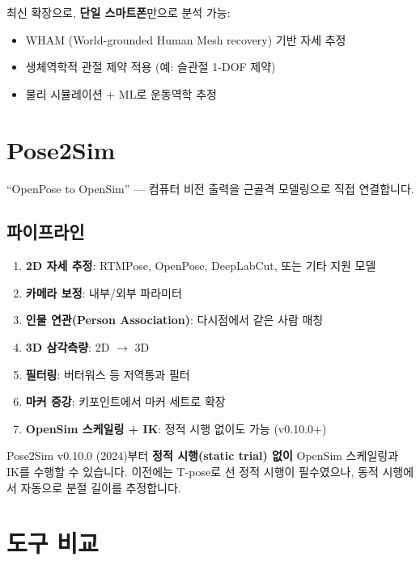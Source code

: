 \documentclass[11pt, a4paper]{report}
\begin{document}
최신 확장으로, \textbf{단일 스마트폰}만으로 분석 가능:
\begin{itemize}[leftmargin=*]
  \item WHAM (World-grounded Human Mesh recovery) 기반 자세 추정
  \item 생체역학적 관절 제약 적용 (예: 슬관절 1-DOF 제약)
  \item 물리 시뮬레이션 + ML로 운동역학 추정
\end{itemize}


\section{Pose2Sim}

``OpenPose to OpenSim'' --- 컴퓨터 비전 출력을 근골격 모델링으로 직접 연결합니다.

\subsection{파이프라인}

\begin{enumerate}[leftmargin=*]
  \item \textbf{2D 자세 추정}: RTMPose, OpenPose, DeepLabCut, 또는 기타 지원 모델
  \item \textbf{카메라 보정}: 내부/외부 파라미터
  \item \textbf{인물 연관(Person Association)}: 다시점에서 같은 사람 매칭
  \item \textbf{3D 삼각측량}: 2D $\rightarrow$ 3D
  \item \textbf{필터링}: 버터워스 등 저역통과 필터
  \item \textbf{마커 증강}: 키포인트에서 마커 세트로 확장
  \item \textbf{OpenSim 스케일링 + IK}: 정적 시행 없이도 가능 (v0.10.0+)
\end{enumerate}

\begin{importantnote}
Pose2Sim v0.10.0 (2024)부터 \textbf{정적 시행(static trial) 없이} OpenSim 스케일링과 IK를 수행할 수 있습니다. 이전에는 T-pose로 선 정적 시행이 필수였으나, 동적 시행에서 자동으로 분절 길이를 추정합니다.
\end{importantnote}


\section{도구 비교}
\end{document}
